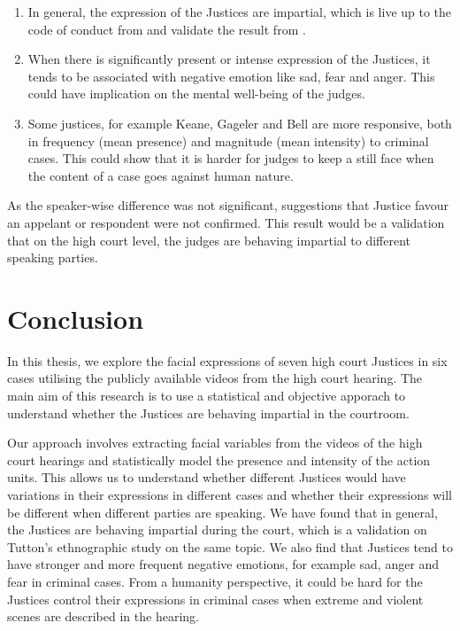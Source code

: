 \documentclass{monashthesis}
\begin{document}
\begin{enumerate}
\def\labelenumi{\arabic{enumi})}
\item
  In general, the expression of the Justices are impartial, which is live up to the code of conduct from \textcite{judicalguid} and validate the result from \textcite{tutton2018judicial}.
\item
  When there is significantly present or intense expression of the Justices, it tends to be associated with negative emotion like sad, fear and anger. This could have implication on the mental well-being of the judges.
\item
  Some justices, for example Keane, Gageler and Bell are more responsive, both in frequency (mean presence) and magnitude (mean intensity) to criminal cases. This could show that it is harder for judges to keep a still face when the content of a case goes against human nature.
\end{enumerate}

As the speaker-wise difference was not significant, suggestions that Justice favour an appelant or respondent were not confirmed.
This result would be a validation that on the high court level, the judges are behaving impartial to different speaking parties.

\hypertarget{conclusion-1}{%
\section{Conclusion}\label{conclusion-1}}

In this thesis, we explore the facial expressions of seven high court Justices in six cases utilising the publicly available videos from the high court hearing. The main aim of this research is to use a statistical and objective apporach to understand whether the Justices are behaving impartial in the courtroom.

Our approach involves extracting facial variables from the videos of the high court hearings and statistically model the presence and intensity of the action units. This allows us to understand whether different Justices would have variations in their expressions in different cases and whether their expressions will be different when different parties are speaking. We have found that in general, the Justices are behaving impartial during the court, which is a validation on Tutton's ethnographic study on the same topic. We also find that Justices tend to have stronger and more frequent negative emotions, for example sad, anger and fear in criminal cases. From a humanity perspective, it could be hard for the Justices control their expressions in criminal cases when extreme and violent scenes are described in the hearing.
\end{document}
